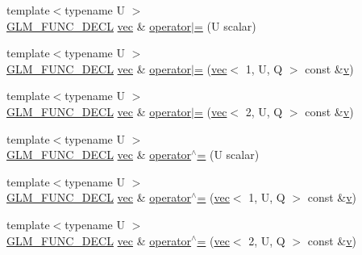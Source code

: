 \begin{DoxyCompactItemize}
\item 
{\footnotesize template$<$typename U $>$ }\\\mbox{\hyperlink{setup_8hpp_ab2d052de21a70539923e9bcbf6e83a51}{G\+L\+M\+\_\+\+F\+U\+N\+C\+\_\+\+D\+E\+CL}} \mbox{\hyperlink{structglm_1_1vec}{vec}} \& \mbox{\hyperlink{structglm_1_1vec_3_012_00_01_t_00_01_q_01_4_a6f02d011da89c44a43c8ff139bafe9fa}{operator$\vert$=}} (U scalar)
\item 
{\footnotesize template$<$typename U $>$ }\\\mbox{\hyperlink{setup_8hpp_ab2d052de21a70539923e9bcbf6e83a51}{G\+L\+M\+\_\+\+F\+U\+N\+C\+\_\+\+D\+E\+CL}} \mbox{\hyperlink{structglm_1_1vec}{vec}} \& \mbox{\hyperlink{structglm_1_1vec_3_012_00_01_t_00_01_q_01_4_aa5a9bdd476d4095d33cd04662df20fcb}{operator$\vert$=}} (\mbox{\hyperlink{structglm_1_1vec}{vec}}$<$ 1, U, Q $>$ const \&\mbox{\hyperlink{_s_d_l__opengl_8h_a10a82eabcb59d2fcd74acee063775f90}{v}})
\item 
{\footnotesize template$<$typename U $>$ }\\\mbox{\hyperlink{setup_8hpp_ab2d052de21a70539923e9bcbf6e83a51}{G\+L\+M\+\_\+\+F\+U\+N\+C\+\_\+\+D\+E\+CL}} \mbox{\hyperlink{structglm_1_1vec}{vec}} \& \mbox{\hyperlink{structglm_1_1vec_3_012_00_01_t_00_01_q_01_4_ad50a7c0287c528e30aa091dd98595452}{operator$\vert$=}} (\mbox{\hyperlink{structglm_1_1vec}{vec}}$<$ 2, U, Q $>$ const \&\mbox{\hyperlink{_s_d_l__opengl_8h_a10a82eabcb59d2fcd74acee063775f90}{v}})
\item 
{\footnotesize template$<$typename U $>$ }\\\mbox{\hyperlink{setup_8hpp_ab2d052de21a70539923e9bcbf6e83a51}{G\+L\+M\+\_\+\+F\+U\+N\+C\+\_\+\+D\+E\+CL}} \mbox{\hyperlink{structglm_1_1vec}{vec}} \& \mbox{\hyperlink{structglm_1_1vec_3_012_00_01_t_00_01_q_01_4_af112affb46b25559da949c6247850d8d}{operator$^\wedge$=}} (U scalar)
\item 
{\footnotesize template$<$typename U $>$ }\\\mbox{\hyperlink{setup_8hpp_ab2d052de21a70539923e9bcbf6e83a51}{G\+L\+M\+\_\+\+F\+U\+N\+C\+\_\+\+D\+E\+CL}} \mbox{\hyperlink{structglm_1_1vec}{vec}} \& \mbox{\hyperlink{structglm_1_1vec_3_012_00_01_t_00_01_q_01_4_a78bce23dda849b6e10228af66f698597}{operator$^\wedge$=}} (\mbox{\hyperlink{structglm_1_1vec}{vec}}$<$ 1, U, Q $>$ const \&\mbox{\hyperlink{_s_d_l__opengl_8h_a10a82eabcb59d2fcd74acee063775f90}{v}})
\item 
{\footnotesize template$<$typename U $>$ }\\\mbox{\hyperlink{setup_8hpp_ab2d052de21a70539923e9bcbf6e83a51}{G\+L\+M\+\_\+\+F\+U\+N\+C\+\_\+\+D\+E\+CL}} \mbox{\hyperlink{structglm_1_1vec}{vec}} \& \mbox{\hyperlink{structglm_1_1vec_3_012_00_01_t_00_01_q_01_4_aee4803e0202a355622479781010b203b}{operator$^\wedge$=}} (\mbox{\hyperlink{structglm_1_1vec}{vec}}$<$ 2, U, Q $>$ const \&\mbox{\hyperlink{_s_d_l__opengl_8h_a10a82eabcb59d2fcd74acee063775f90}{v}})

\end{DoxyCompactItemize}
